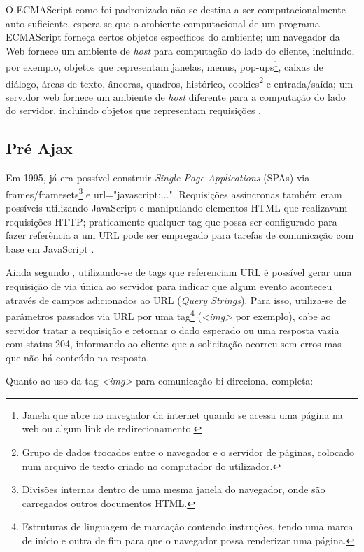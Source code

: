 O ECMAScript como foi padronizado não se destina a ser computacionalmente auto-suficiente, espera-se que o ambiente computacional de um programa ECMAScript forneça certos objetos específicos do ambiente; um navegador da Web fornece um ambiente de \emph{host} para computação do lado do cliente, incluindo, por exemplo, objetos que representam janelas, menus, pop-ups\footnote{Janela que abre no navegador da internet quando se acessa uma página na web ou algum link de redirecionamento.}, caixas de diálogo, áreas de texto, âncoras, quadros, histórico, cookies\footnote{Grupo de dados trocados entre o navegador e o servidor de páginas, colocado num arquivo de texto criado no computador do utilizador.} e entrada/saída; um servidor web fornece um ambiente de \emph{host} diferente para a computação do lado do servidor, incluindo objetos que representam requisições \cite{ecmascript2016}.

\subsection{Pré Ajax}

Em 1995, já era possível construir \emph{Single Page Applications} (SPAs) via frames/framesets\footnote{Divisões internas dentro de uma mesma janela do navegador, onde são carregados outros documentos HTML.} e url="javascript:...". Requisições assíncronas também eram possíveis utilizando JavaScript e manipulando elementos HTML que realizavam requisições HTTP; praticamente qualquer tag que possa ser configurado para fazer referência a um URL pode ser empregado para tarefas de comunicação com base em JavaScript \cite{powell2008ajax}.

Ainda segundo , utilizando-se de tags que referenciam URL é possível gerar uma requisição de via única ao servidor para indicar que algum evento aconteceu através de campos adicionados ao URL (\emph{Query Strings}). Para isso, utiliza-se de parâmetros passados via URL por uma tag\footnote{Estruturas de linguagem de marcação contendo instruções, tendo uma marca de início e outra de fim para que o navegador possa renderizar uma página.} (\emph{<img>} por exemplo), cabe ao servidor tratar a requisição e retornar o dado esperado ou uma resposta vazia com status 204, informando ao cliente que a solicitação ocorreu sem erros mas que não há conteúdo na resposta.

Quanto ao uso da tag \emph{<img>} para comunicação bi-direcional  completa:

